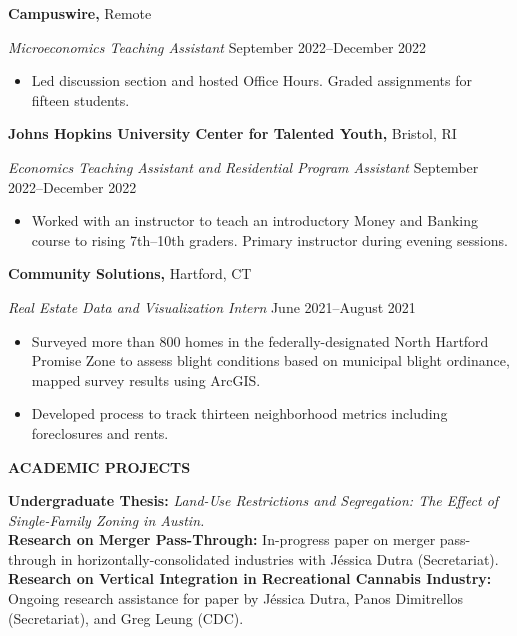 \documentclass[11pt]{article}
\begin{document}
\textbf{Campuswire,} \hfill Remote

\textit{Microeconomics Teaching Assistant} \hfill September 2022--December 2022
\begin{itemize}[noitemsep, topsep=0pt, partopsep=0pt, parsep=0pt]
    \item Led discussion section and hosted Office Hours. Graded assignments for fifteen students.
\end{itemize}
\vspace{12pt}

\textbf{Johns Hopkins University Center for Talented Youth,} \hfill Bristol, RI

\textit{Economics Teaching Assistant and Residential Program Assistant} \hfill September 2022--December 2022
\begin{itemize}[noitemsep, topsep=0pt, partopsep=0pt, parsep=0pt]
    \item Worked with an instructor to teach an introductory Money and Banking course to rising 7th--10th graders. Primary instructor during evening sessions.
\end{itemize}

\vspace{12pt}

\textbf{Community Solutions,} \hfill Hartford, CT

\textit{Real Estate Data and Visualization Intern} \hfill June 2021--August 2021
\begin{itemize}[noitemsep, topsep=0pt, partopsep=0pt, parsep=0pt]
    \item Surveyed more than 800 homes in the federally-designated North Hartford Promise Zone to assess blight conditions based on municipal blight ordinance, mapped survey results using ArcGIS.
    \item Developed process to track thirteen neighborhood metrics including foreclosures and rents.
\end{itemize}

\begin{center}
    \textbf{ACADEMIC PROJECTS}
\end{center}

\textbf{Undergraduate Thesis:} \textit{Land-Use Restrictions and Segregation: The Effect of Single-Family Zoning in Austin.}\\
\textbf{Research on Merger Pass-Through:} In-progress paper on merger pass-through in horizontally-consolidated industries with J\'essica Dutra (Secretariat). \\
\textbf{Research on Vertical Integration in Recreational Cannabis Industry:} Ongoing research assistance for paper by J\'essica Dutra, Panos Dimitrellos (Secretariat), and Greg Leung (CDC).
\end{document}
